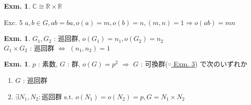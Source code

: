 \documentclass[uplatex,dvipdfmx,9pt]{beamer}
\newcommand{\st}{\text{ s.t. }}
\newcounter{textExmCount}
\theoremstyle{definition} %
\theoremstyle{example}
\newtheorem{exmText}[textExmCount]{Exm.}
\begin{document}
      \begin{frame}

        \begin{exmText}
          $\mathbb{C} \cong \mathbb{R} \times \mathbb{R}$
        \end{exmText}

        \begin{exampleblock}{ Exc. 5}
          $a, b \in G, ab = ba, o(a) = m, o(b) = n, (m, n) = 1 \Rightarrow o(ab) = mn$
        \end{exampleblock}

        \begin{exmText}
          $G_1, G_2$ : 巡回群, $o(G_1) = n_1, o(G_2) = n_2$ \\
          $G_1 \times G_2$ : 巡回群 $\Leftrightarrow$ $(n_1, n_2) = 1$
        \end{exmText}

        \begin{exmText}
          $p$ : 素数, $G$ : 群, $o(G) = p^2$ $\Rightarrow$ $G$ : 可換群($\because$\hyperlink{exmText7-3}{ Exm. 3}) で次のいずれか \\
          \begin{enumerate}
            \item $G$ : 巡回群
            \item $\exists N_1, N_2 : \text{巡回群} \st o(N_1) = o(N_2) = p, G = N_1 \times N_2$
          \end{enumerate}
        \end{exmText}
        
      \end{frame}
\end{document}
